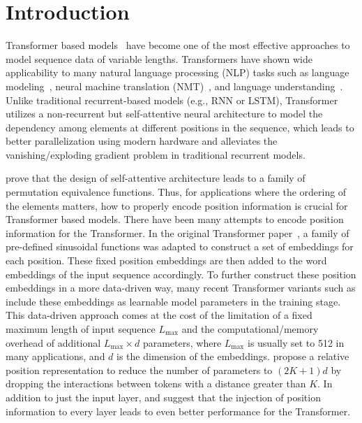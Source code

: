 \documentclass[11pt]{article}
\begin{document}
\section{Introduction}
\label{sec:intro}
Transformer based models~\cite{vaswani2017attention,devlin2018bert,yang2019xlnet,radford2019language, lan2019albert,raffel2019exploring}
have become one of the most effective approaches to model sequence data of
variable lengths. Transformers have shown wide applicability to many natural
language processing (NLP) tasks such as language
modeling~\cite{radford2019language}, neural machine translation
(NMT)~\cite{vaswani2017attention}, and language
understanding~\cite{devlin2018bert}.  Unlike traditional recurrent-based
models (e.g., RNN or LSTM), Transformer utilizes a non-recurrent but
self-attentive neural architecture to model the dependency among elements at
different positions in the sequence, which leads to better parallelization
using modern hardware and alleviates the vanishing/exploding gradient problem
in traditional recurrent models.
\par
\cite{yun2019Transformers} prove that the design of self-attentive architecture leads to a family of permutation equivalence functions. Thus, for applications where the ordering of the elements matters, how to properly encode position information is crucial for  Transformer based models. There have been many attempts to encode position information for the Transformer. In the original Transformer paper~\cite{vaswani2017attention}, a family of pre-defined sinusoidal functions was adapted to construct a set of embeddings for each position. These fixed position embeddings are then added to the word embeddings of the input sequence accordingly. To further construct these position embeddings in a more data-driven way, many recent Transformer variants such as \cite{devlin2018bert, liu2019roberta} include these embeddings as learnable model parameters in the training stage. This data-driven approach comes at the cost of the limitation of a fixed maximum length of input sequence $L_{\text{max}}$ and the computational/memory overhead of additional $L_{\text{max}}\times d$ parameters, where $L_{\text{max}}$ is usually set to 512 in many applications, and $d$ is the dimension of the embeddings. \cite{shaw2018self} propose a relative position representation to reduce the number of parameters to $(2K+1) d$ by dropping the interactions between tokens with a distance greater than $K$. In addition to just the input layer, \cite{dehghani2018universal} and \cite{lan2019albert} suggest that the injection of position information to every layer leads to even better performance for the Transformer.
\end{document}
